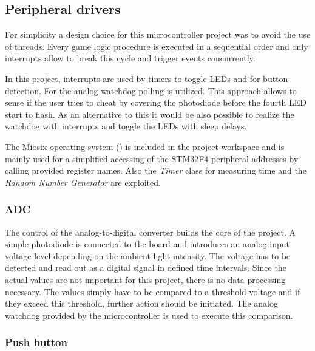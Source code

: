 \subsection{Peripheral drivers}
For simplicity a design choice for this microcontroller project was to avoid the use of threads. Every game logic procedure is executed in a sequential order and only interrupts allow to break this cycle and trigger events concurrently.\\
\par
In this project, interrupts are used by timers to toggle LEDs and for button detection. For the analog watchdog polling is utilized.
This approach allows to sense if the user tries to cheat by covering the photodiode before the fourth LED start to flash. As an alternative to this it would be also possible to realize the watchdog with interrupts and toggle the LEDs with sleep delays.\\
\par
The Miosix operating system (\cite{Miosix}) is included in the project workspace and is mainly used for a simplified accessing of the STM32F4 peripheral addresses by calling provided register names. Also the \emph{Timer} class for measuring time and the \emph{Random Number Generator} are exploited.

\subsubsection{ADC}
The control of the analog-to-digital converter builds the core of the project. A simple photodiode is connected to the board and introduces an analog input voltage level depending on the ambient light intensity. The voltage has to be detected and read out as a digital signal in defined time intervals. Since the actual values are not important for this project, there is no data processing necessary. The values simply have to be compared to a threshold voltage and if they exceed this threshold, further action should be initiated. The analog watchdog provided by the microcontroller is used to execute this comparison.


\subsubsection{Push button}

